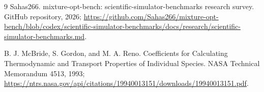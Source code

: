\documentclass[11pt]{article}
\begin{document}
\begin{thebibliography}{9}
Sahas266.
\newblock mixture-opt-bench: scientific-simulator-benchmarks research survey.
\newblock GitHub repository, 2026; \url{https://github.com/Sahas266/mixture-opt-bench/blob/codex/scientific-simulator-benchmarks/docs/research/scientific-simulator-benchmarks.md}.

B. J. McBride, S. Gordon, and M. A. Reno.
\newblock Coefficients for Calculating Thermodynamic and Transport Properties of Individual Species.
\newblock NASA Technical Memorandum 4513, 1993; \url{https://ntrs.nasa.gov/api/citations/19940013151/downloads/19940013151.pdf}.

\end{thebibliography}
\end{document}
